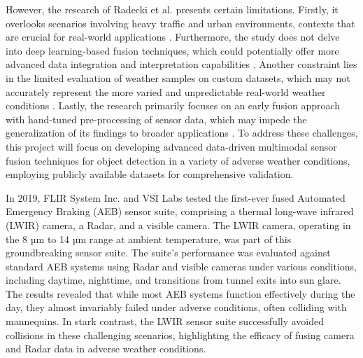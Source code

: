 \documentclass[report.tex]{subfiles}
\begin{document}

    However, the research of Radecki et al. \cite{radecki2016all} presents certain limitations. Firstly, it overlooks scenarios involving heavy traffic and urban environments, contexts that are crucial for real-world applications \cite{cai2020probabilistic}. Furthermore, the study does not delve into deep learning-based fusion techniques, which could potentially offer more advanced data integration and interpretation capabilities \cite{diaby2021evidential}. Another constraint lies in the limited evaluation of weather samples on custom datasets, which may not accurately represent the more varied and unpredictable real-world weather conditions \cite{galvao2021pedestrian}. Lastly, the research primarily focuses on an early fusion approach with hand-tuned pre-processing of sensor data, which may impede the generalization of its findings to broader applications \cite{rizzoli2022multimodal}. To address these challenges, this project will focus on developing advanced data-driven multimodal sensor fusion techniques for object detection in a variety of adverse weather conditions, employing publicly available datasets for comprehensive validation.

    In 2019, FLIR System Inc. \cite{fused_aeb} and VSI Labs \cite{VSILabs} tested the first-ever fused Automated Emergency Braking (AEB) sensor suite, comprising a thermal long-wave infrared (LWIR) camera, a Radar, and a visible camera. The LWIR camera, operating in the 8 µm to 14 µm range at ambient temperature, was part of this groundbreaking sensor suite. The suite's performance was evaluated against standard AEB systems using Radar and visible cameras under various conditions, including daytime, nighttime, and transitions from tunnel exits into sun glare. The results revealed that while most AEB systems function effectively during the day, they almost invariably failed under adverse conditions, often colliding with mannequins. In stark contrast, the LWIR sensor suite successfully avoided collisions in these challenging scenarios, highlighting the efficacy of fusing camera and Radar data in adverse weather conditions.
\end{document}
